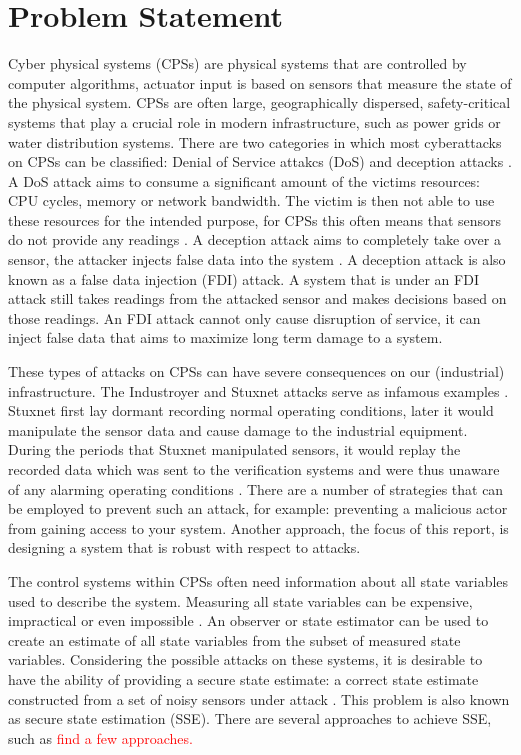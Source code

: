 \section{Problem Statement}
Cyber physical systems (CPSs) are physical systems that are controlled by computer algorithms, actuator input is based on sensors that measure the state of the physical system. CPSs are often large, geographically dispersed, safety-critical systems that play a crucial role in modern infrastructure, such as power grids or water distribution systems. There are two categories in which most cyberattacks on CPSs can be classified: Denial of Service attakcs (DoS) and deception attacks \cite{Ding2021SecureSurvey}. A DoS attack aims to consume a significant amount of the victims resources: CPU cycles, memory or network bandwidth. The victim is then not able to use these resources for the intended purpose, for CPSs this often means that sensors do not provide any readings \cite{Yu2014AnAttacks}. A deception attack aims to completely take over a sensor, the attacker injects false data into the system \cite{Serpanos2022FalseSystems}. A deception attack is also known as a false data injection (FDI) attack. A system that is under an FDI attack still takes readings from the attacked sensor and makes decisions based on those readings. An FDI attack cannot only cause disruption of service, it can inject false data that aims to maximize long term damage to a system. 

These types of attacks on CPSs can have severe consequences on our (industrial) infrastructure. The Industroyer and Stuxnet attacks serve as infamous examples \cite{Lameiras2022Industroyer:Grid}\cite{Kushner2013TheStuxnet}. Stuxnet first lay dormant recording normal operating conditions, later it would manipulate the sensor data and cause damage to the industrial equipment. During the periods that Stuxnet manipulated sensors, it would replay the recorded data which was sent to the verification systems and were thus unaware of any alarming operating conditions \cite{Fidler2011Was_Stuxnet_an_Act_of_War_Decoding_a_Cyberattack}. There are a number of strategies that can be employed to prevent such an attack, for example: preventing a malicious actor from gaining access to your system. Another approach, the focus of this report, is designing a system that is robust with respect to attacks. 

The control systems within CPSs often need information about all state variables used to describe the system. Measuring all state variables can be expensive, impractical or even impossible \cite{yappa}. An observer or state estimator can be used to create an estimate of all state variables from the subset of measured state variables. Considering the possible attacks on these systems, it is desirable to have the ability of providing a secure state estimate: a correct state estimate constructed from a set of noisy sensors under attack \cite{Shoukry2017SecureApproach}. This problem is also known as secure state estimation (SSE). There are several approaches to achieve SSE, such as \textcolor{red}{find a few approaches.}


